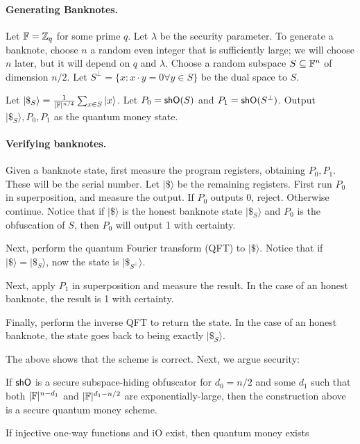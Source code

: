 \paragraph{Generating Banknotes.} Let ${\mathbb F}=\mathbb{Z}_q$ for some prime $q$.  Let $\lambda$ be the security parameter.  To generate a banknote, choose $n$ a random even integer that is sufficiently large; we will choose $n$ later, but it will depend on $q$ and $\lambda$.  Choose a random subspace $S\subseteq {\mathbb F}^n$ of dimension $n/2$.  Let $S^\bot=\{x:x\cdot y=0\forall y\in S\}$ be the dual space to $S$.  

Let $|\$_S\rangle=\frac{1}{|{\mathbb F}|^{n/4}}\sum_{x\in S}|x\rangle$.  Let $P_0={\sf shO}(S)$ and $P_1={\sf shO}(S^\bot)$.  Output $|\$_S\rangle,P_0,P_1$ as the quantum money state.

\paragraph{Verifying banknotes.} Given a banknote state, first measure the program registers, obtaining $P_0,P_1$.  These will be the serial number.  Let $|\$\rangle$ be the remaining registers.  First run $P_0$ in superposition, and measure the output.  If $P_0$ outputs 0, reject.  Otherwise continue.  Notice that if $|\$\rangle$ is the honest banknote state $|\$_S\rangle$ and $P_0$ is the obfuscation of $S$, then $P_0$ will output 1 with certainty.  

Next, perform the quantum Fourier transform (QFT) to $|\$\rangle$.  Notice that if $|\$\rangle=|\$_S\rangle$, now the state is $|\$_{S^\bot}\rangle$.  

Next, apply $P_1$ in superposition and measure the result.  In the case of an honest banknote, the result is 1 with certainty.  

Finally, perform the inverse QFT to return the state.  In the case of an honest banknote, the state goes back to being exactly $|\$_S\rangle$.


\medskip

The above shows that the scheme is correct.  Next, we argue security:

\begin{theorem}\label{thm:qmoney} If ${\sf shO}$ is a secure subspace-hiding obfuscator for $d_0=n/2$ and some $d_1$ such that both $|{\mathbb F}|^{n-d_1}$ and $|{\mathbb F}|^{d_1-n/2}$ are exponentially-large, then the construction above is a secure quantum money scheme.
\end{theorem}

\begin{corollary} If injective one-way functions and iO exist, then quantum money exists
\end{corollary}

